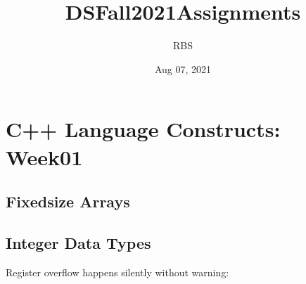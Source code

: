 \documentclass[letterpaper,10pt,english,openany,oneside]{sphinxmanual}
\title{DS\sphinxhyphen{}Fall2021\sphinxhyphen{}Assignments}
\date{Aug 07, 2021}
\author{RBS}
\begin{document}
\pagestyle{empty}

\pagestyle{plain}

\pagestyle{normal}
\label{\detokenize{index::doc}}



\chapter{C++ Language Constructs: Week01}
\label{\detokenize{constructs-week01:c-language-constructs-week01}}\label{\detokenize{constructs-week01::doc}}

\section{Fixed\sphinxhyphen{}size Arrays}
\label{\detokenize{constructs-week01:fixed-size-arrays}}

\section{Integer Data Types}
\label{\detokenize{constructs-week01:integer-data-types}}
\sphinxAtStartPar
Register overflow happens silently without warning:
\end{document}

